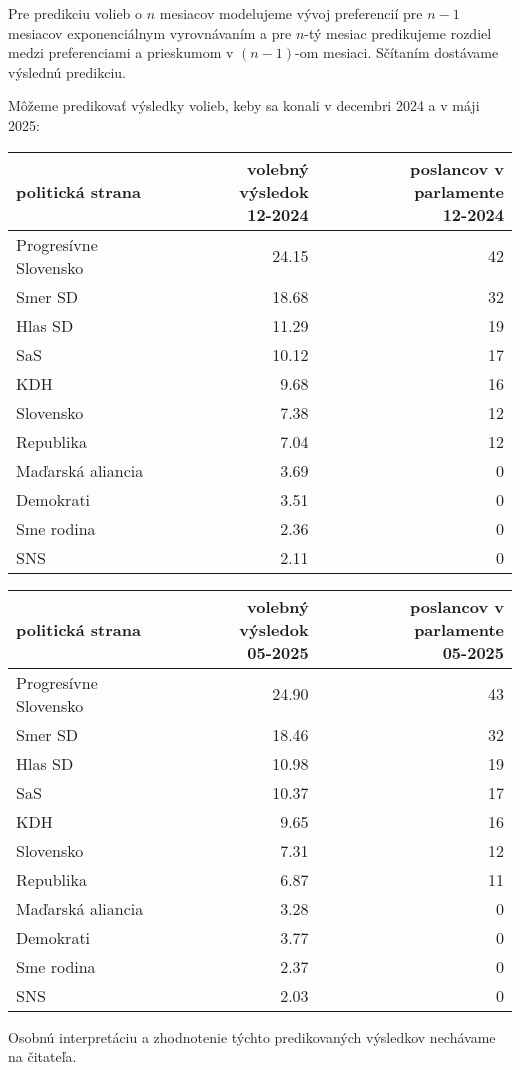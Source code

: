 \documentclass[report.tex]{subfiles}
\begin{document}
Pre predikciu volieb o $n$ mesiacov modelujeme vývoj preferencií pre $n-1$ mesiacov exponenciálnym vyrovnávaním a pre $n$-tý mesiac predikujeme rozdiel medzi preferenciami a prieskumom v $(n-1)$-om mesiaci. Sčítaním dostávame výslednú predikciu.


Môžeme predikovať výsledky volieb, keby sa konali v decembri 2024 a v máji 2025:

\begin{center}
	\small
\begin{tabular}{lrr}
	\toprule
	politická strana &  \parbox{3.5cm}{\raggedleft volebný výsledok \\ 12-2024} & \parbox{5cm}{\raggedleft poslancov v parlamente \\ 12-2024} \\
	\midrule
	Progresívne Slovensko & 24.15 & 42 \\
	Smer SD & 18.68 & 32 \\
	Hlas SD & 11.29 & 19 \\
	SaS & 10.12 & 17 \\
	KDH & 9.68 & 16 \\
	Slovensko & 7.38 & 12 \\
	Republika & 7.04 & 12 \\
	Maďarská aliancia & 3.69 & 0 \\
	Demokrati & 3.51 & 0 \\
	Sme rodina & 2.36 & 0 \\
	SNS & 2.11 & 0 \\
	\bottomrule
\end{tabular}

\begin{tabular}{lrr}
	\toprule
	politická strana &  \parbox{3.5cm}{\raggedleft volebný výsledok \\ 05-2025} & \parbox{5cm}{\raggedleft poslancov v parlamente \\ 05-2025} \\
	\midrule
	Progresívne Slovensko & 24.90 & 43 \\
	Smer SD & 18.46 & 32 \\
	Hlas SD & 10.98 & 19 \\
	SaS & 10.37 & 17 \\
	KDH & 9.65 & 16 \\
	Slovensko & 7.31 & 12 \\
	Republika & 6.87 & 11 \\
	Maďarská aliancia & 3.28 & 0 \\
	Demokrati & 3.77 & 0 \\
	Sme rodina & 2.37 & 0 \\
	SNS & 2.03 & 0 \\
	\bottomrule
\end{tabular}
\end{center}

Osobnú interpretáciu a zhodnotenie týchto predikovaných výsledkov nechávame na čitateľa.
	
\end{document}
